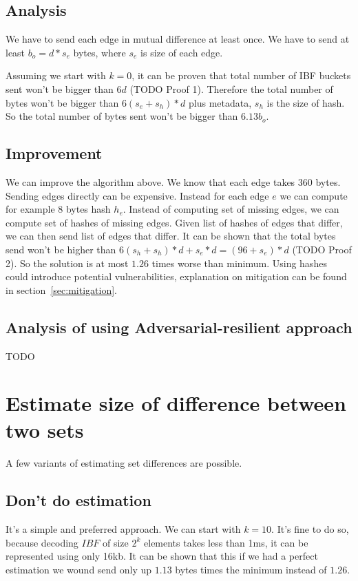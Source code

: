 \documentclass[11pt]{article}
\begin{document}
\subsection{Analysis}
We have to send each edge in mutual difference at least once.
We have to send at least $b_o = d*s_e$ bytes, where $s_e$ is size of each edge.

Assuming we start with $k=0$, it can be proven that total number of IBF buckets sent won't be bigger than $6d$  (TODO Proof 1).
Therefore the total number of bytes won't be bigger than $6(s_e+s_h)*d$ plus metadata, $s_h$ is the size of hash.
So the total number of bytes sent won't be bigger than $6.13b_o$.
\subsection{Improvement}
We can improve the algorithm above.
We know that each edge takes 360 bytes.
Sending edges directly can be expensive.
Instead for each edge $e$ we can compute for example 8 bytes hash $h_e$.
Instead of computing set of missing edges, we can compute set of hashes of missing edges.
Given list of hashes of edges that differ, we can then send list of edges that differ.
It can be shown that the total bytes send won't be higher than $6(s_h+s_h)*d + s_e * d = (96+s_e)*d$ (TODO Proof 2).
So the solution is at most $1.26$ times worse than minimum.
Using hashes could introduce potential vulnerabilities, explanation on mitigation can be found in section~\ref{sec:mitigation}.

\subsection{Analysis of using Adversarial-resilient approach}
TODO

\section{Estimate size of difference between two sets}\label{sec:estimate}
A few variants of estimating set differences are possible.
\subsection{Don't do estimation}
It's a simple and preferred approach.
We can start with $k = 10$.
It's fine to do so, because decoding $IBF$ of size $2^k$ elements takes less than 1ms, it can be represented using only 16kb.
It can be shown that this if we had a perfect estimation we wound send only up $1.13$ bytes times the minimum instead of $1.26$.
\end{document}
